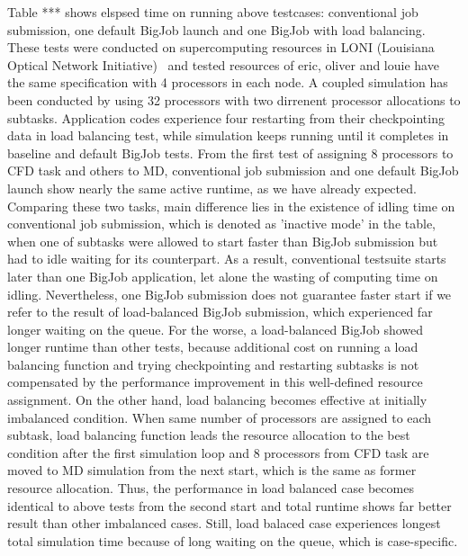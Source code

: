 \documentclass[conference,final]{IEEEtran}
\begin{document}
Table *** shows elspsed time on running above testcases: conventional job submission, one default BigJob launch and one BigJob with load balancing. These tests were conducted on supercomputing resources in LONI (Louisiana Optical Network Initiative)~\cite{LONI_web} and tested resources of eric, oliver and louie have the same specification with 4 processors in each node. A coupled simulation has been conducted by using 32 processors with two dirrenent processor allocations to subtasks. Application codes experience four restarting from their checkpointing data in load balancing test, while simulation keeps running until it completes in baseline and default BigJob tests.
From the first test of assigning 8 processors to CFD task and others to MD, conventional job submission and one default BigJob launch show nearly the same active runtime, as we have already expected. Comparing these two tasks, main difference lies in the existence of idling time on conventional job submission, which is denoted as 'inactive mode' in the table, when one of subtasks were allowed to start faster than BigJob submission but had to idle waiting for its counterpart. As a result, conventional testsuite starts later than one BigJob application, let alone the wasting of computing time on idling. Nevertheless, one BigJob submission does not guarantee faster start if we refer to the result of load-balanced BigJob submission, which experienced far longer waiting on the queue. For the worse, a load-balanced BigJob showed longer runtime than other tests, because additional cost on running a load balancing function and trying checkpointing and restarting subtasks is not compensated by the performance improvement in this well-defined resource assignment.
On the other hand, load balancing becomes effective at initially imbalanced condition. When same number of processors are assigned to each subtask, load balancing function leads the resource allocation to the best condition after the first simulation loop and 8 processors from CFD task are moved to MD simulation from the next start, which is the same as former resource allocation. Thus, the performance in load balanced case becomes identical to above tests from the second start and total runtime shows far better result than other imbalanced cases. Still, load balaced case experiences longest total simulation time because of long waiting on the queue, which is case-specific.
\end{document}
